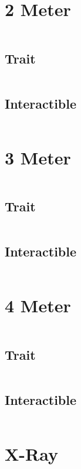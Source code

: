 \documentclass[main.tex]{subfiles}
\begin{document}
\section{2 Meter}


\begin{lstlisting}[language=FG]
\end{lstlisting}

\subsection{Trait}

\begin{lstlisting}[language=FG]
\end{lstlisting}


\subsection{Interactible}
\begin{lstlisting}[language=FG]

\end{lstlisting}

\section{3 Meter}


\begin{lstlisting}[language=FG]
\end{lstlisting}

\subsection{Trait}

\begin{lstlisting}[language=FG]
\end{lstlisting}


\subsection{Interactible}
\begin{lstlisting}[language=FG]

\end{lstlisting}
\section{4 Meter}

\begin{lstlisting}[language=FG]
\end{lstlisting}

\subsection{Trait}

\begin{lstlisting}[language=FG]
\end{lstlisting}


\subsection{Interactible}
\begin{lstlisting}[language=FG]

\end{lstlisting}

\section{X-Ray}
\end{document}
